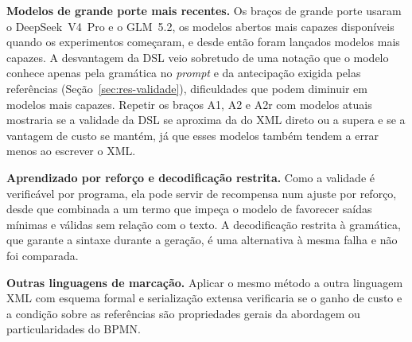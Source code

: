 \textbf{Modelos de grande porte mais recentes.} Os braços de grande porte usaram o DeepSeek~V4~Pro e o GLM~5.2, os modelos abertos mais capazes disponíveis quando os experimentos começaram, e desde então foram lançados modelos mais capazes. A desvantagem da DSL veio sobretudo de uma notação que o modelo conhece apenas pela gramática no \textit{prompt} e da antecipação exigida pelas referências (Seção~\ref{sec:res-validade}), dificuldades que podem diminuir em modelos mais capazes. Repetir os braços A1, A2 e A2r com modelos atuais mostraria se a validade da DSL se aproxima da do XML direto ou a supera e se a vantagem de custo se mantém, já que esses modelos também tendem a errar menos ao escrever o XML.

\textbf{Aprendizado por reforço e decodificação restrita.} Como a validade é verificável por programa, ela pode servir de recompensa num ajuste por reforço, desde que combinada a um termo que impeça o modelo de favorecer saídas mínimas e válidas sem relação com o texto. A decodificação restrita à gramática, que garante a sintaxe durante a geração, é uma alternativa à mesma falha e não foi comparada.

\textbf{Outras linguagens de marcação.} Aplicar o mesmo método a outra linguagem XML com esquema formal e serialização extensa verificaria se o ganho de custo e a condição sobre as referências são propriedades gerais da abordagem ou particularidades do BPMN.
